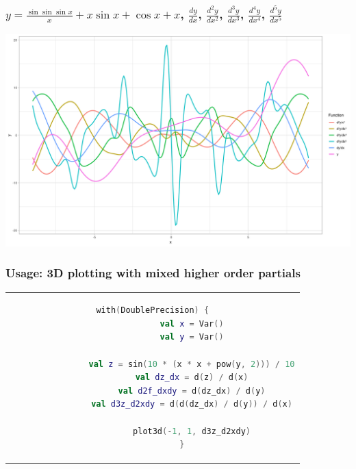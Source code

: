 \documentclass{beamer}
\begin{document}
    \begin{frame}
        \frametitle{$y = \frac{\sin{\sin{\sin{x}}}}{x} + x \sin{x} + \cos{x} + x$, $\frac{dy}{dx}$, $\frac{d^{2}y}{dx^2}$, $\frac{d^{3}y}{dx^3}$, $\frac{d^{4}y}{dx^4}$, $\frac{d^{5}y}{dx^5}$}
        \begin{center}
            \includegraphics[scale=0.35]{plot.png}
        \end{center}
    \end{frame}

    \begin{frame}[fragile]
        \frametitle{Usage: 3D plotting with mixed higher order partials}

        \begin{center}
            \begin{tabular}{c}
        \begin{lstlisting}[language=Kotlin, gobble=12]
            with(DoublePrecision) {
                val x = Var()
                val y = Var()

                val z = sin(10 * (x * x + pow(y, 2))) / 10
                val dz_dx = d(z) / d(x)
                val d2f_dxdy = d(dz_dx) / d(y)
                val d3z_d2xdy = d(d(dz_dx) / d(y)) / d(x)

                plot3d(-1, 1, d3z_d2xdy)
            }
        \end{lstlisting}
            \end{tabular}
        \end{center}
    \end{frame}
\end{document}
